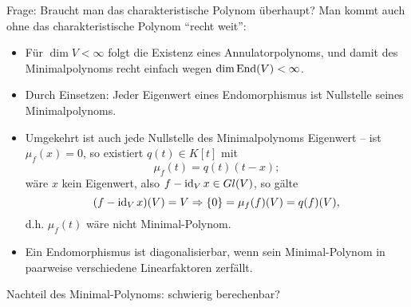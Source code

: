 	Frage: Braucht man das charakteristische Polynom überhaupt?
	Man kommt auch ohne das charakteristische Polynom "`recht weit"':
		\begin{itemize}
			\item Für $ \dim V <\infty $ folgt die Existenz eines Annulatorpolynoms, und damit des Minimalpolynoms recht einfach wegen $ \dim \operatorname{End}(V) <\infty $.
			\item Durch Einsetzen: Jeder Eigenwert eines Endomorphismus ist Nullstelle seines Minimalpolynoms.
			\item Umgekehrt ist auch jede Nullstelle des Minimalpolynoms Eigenwert -- ist $ \mu_f(x) = 0 $, so existiert $ q(t)\in K[t] $ mit
				\[ \mu_f(t) = q(t)(t-x); \]
			wäre $ x $ kein Eigenwert, also $ f-\operatorname{id}_V x \in Gl(V) $, so gälte
				\[ (f-\operatorname{id}_Vx)(V) = V \Rightarrow \{0\} = \mu_f(f)(V) = q(f)(V), \]
			d.h. $ \mu_f(t) $ wäre nicht Minimal-Polynom.
			\item Ein Endomorphismus ist diagonalisierbar, wenn sein Minimal-Polynom in paarweise verschiedene Linearfaktoren zerfällt.
		\end{itemize}
	
	Nachteil des Minimal-Polynoms: schwierig berechenbar?